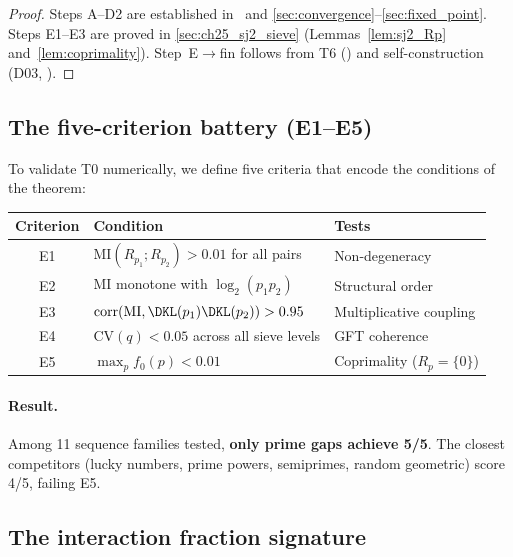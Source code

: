 \documentclass[12pt,a4paper]{article}
\begin{document}
\begin{proof}
Steps A--D2 are established in~\cite{companion_M1,companion_M2} and
\cref{sec:convergence}--\cref{sec:fixed_point}.
Steps E1--E3 are proved in \cref{sec:ch25_sj2_sieve}
(Lemmas~\ref{lem:sj2_Rp} and~\ref{lem:coprimality}).
Step~E$\to$fin follows from T6 (\cite{companion_M1}) and
self-construction (D03, \cite{companion_M1}).
\end{proof}

\subsection{The five-criterion battery (E1--E5)}
\label{sec:ch25_E1E5}

To validate T0 numerically, we define five criteria that encode the
conditions of the theorem:

\begin{center}
\begin{tabular}{cll}
\toprule
Criterion & Condition & Tests \\
\midrule
E1 & $\mathrm{MI}(R_{p_1}; R_{p_2}) > 0.01$ for all pairs & Non-degeneracy \\
E2 & MI monotone with $\log_2(p_1 p_2)$ & Structural order \\
E3 & $\mathrm{corr}(\mathrm{MI}, \DKL(p_1)\DKL(p_2)) > 0.95$ & Multiplicative coupling \\
E4 & $\mathrm{CV}(q) < 0.05$ across all sieve levels & GFT coherence \\
E5 & $\max_p f_0(p) < 0.01$ & Coprimality ($R_p = \{0\}$) \\
\bottomrule
\end{tabular}
\end{center}

\paragraph{Result.} Among 11 sequence families tested, \textbf{only
prime gaps achieve 5/5}. The closest competitors (lucky numbers,
prime powers, semiprimes, random geometric) score 4/5, failing E5.

\subsection{The interaction fraction signature}
\label{sec:ch25_fraction}
\end{document}
